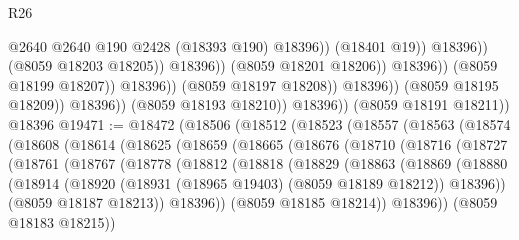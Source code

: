 \begin{lexlean}{R26}
\begin{coremodule}
                                                    @2640
                                                    @2640
                                                    @190
                                                    @2428
                                                    (@18393 @190)
                                                    @18396))
                                                (@18401 @19))
                                              @18396))
                                          (@8059 @18203 @18205))
                                        @18396))
                                    (@8059 @18201 @18206))
                                  @18396))
                              (@8059 @18199 @18207))
                            @18396))
                        (@8059 @18197 @18208))
                      @18396))
                  (@8059 @18195 @18209))
                @18396))
            (@8059 @18193 @18210))
          @18396))
      (@8059 @18191 @18211))
    @18396
@19471 := @18472
    (@18506
      (@18512
        (@18523
          (@18557
            (@18563
              (@18574
                (@18608
                  (@18614
                    (@18625
                      (@18659
                        (@18665
                          (@18676
                            (@18710
                              (@18716
                                (@18727
                                  (@18761
                                    (@18767
                                      (@18778
                                        (@18812
                                          (@18818
                                            (@18829
                                              (@18863
                                                (@18869
                                                  (@18880
                                                    (@18914
                                                      (@18920
                                                        (@18931
                                                          (@18965 @19403)
                                                          (@8059 @18189 @18212))
                                                        @18396))
                                                    (@8059 @18187 @18213))
                                                  @18396))
                                              (@8059 @18185 @18214))
                                            @18396))
                                        (@8059 @18183 @18215))

\end{coremodule}
\end{lexlean}
